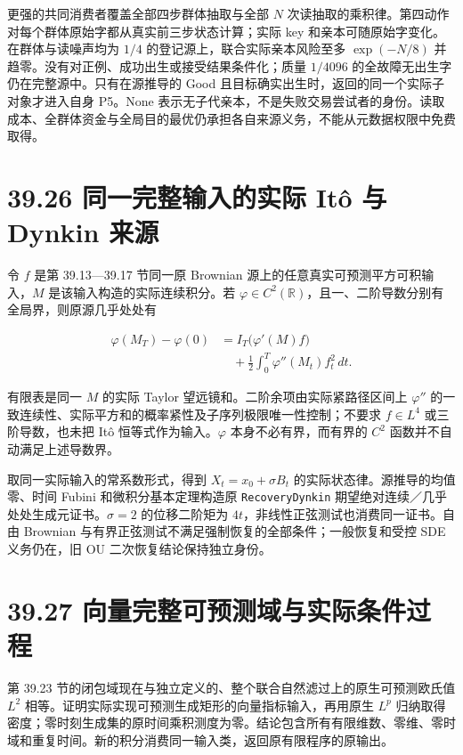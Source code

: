 \documentclass[
  11pt,
  oneside]{book}
\begin{document}
更强的共同消费者覆盖全部四步群体抽取与全部 \(N\) 次读抽取的乘积律。第四动作对每个群体原始字都从真实前三步状态计算；实际 key 和亲本可随原始字变化。在群体与读噪声均为 \(1/4\) 的登记源上，联合实际亲本风险至多 \(\exp(-N/8)\) 并趋零。没有对正例、成功出生或接受结果条件化；质量 \(1/4096\) 的全故障无出生字仍在完整源中。只有在源推导的 Good 且目标确实出生时，返回的同一个实际子对象才进入自身 P5。None 表示无子代亲本，不是失败交易尝试者的身份。读取成本、全群体资金与全局目的最优仍承担各自来源义务，不能从元数据权限中免费取得。

\section{39.26 同一完整输入的实际 Itô 与 Dynkin 来源}\label{ux540cux4e00ux5b8cux6574ux8f93ux5165ux7684ux5b9eux9645-ituxf4-ux4e0e-dynkin-ux6765ux6e90}

令 \(f\) 是第 39.13---39.17 节同一原 Brownian 源上的任意真实可预测平方可积输入，\(M\) 是该输入构造的实际连续积分。若 \(\varphi\in C^2(\mathbb R)\)，且一、二阶导数分别有全局界，则原源几乎处处有

\[\begin{aligned}
\varphi(M_T)-\varphi(0)
&=I_T\bigl(\varphi'(M)f\bigr)\\
&\quad+\frac12\int_0^T\varphi''(M_t)f_t^2\,dt.
\end{aligned}\]

有限表是同一 \(M\) 的实际 Taylor 望远镜和。二阶余项由实际紧路径区间上 \(\varphi''\) 的一致连续性、实际平方和的概率紧性及子序列极限唯一性控制；不要求 \(f\in L^4\) 或三阶导数，也未把 Itô 恒等式作为输入。\(\varphi\) 本身不必有界，而有界的 \(C^2\) 函数并不自动满足上述导数界。

取同一实际输入的常系数形式，得到 \(X_t=x_0+\sigma B_t\) 的实际状态律。源推导的均值零、时间 Fubini 和微积分基本定理构造原 \nolinkurl{RecoveryDynkin} 期望绝对连续／几乎处处生成元证书。\(\sigma=2\) 的位移二阶矩为 \(4t\)，非线性正弦测试也消费同一证书。自由 Brownian 与有界正弦测试不满足强制恢复的全部条件；一般恢复和受控 SDE 义务仍在，旧 OU 二次恢复结论保持独立身份。

\section{39.27 向量完整可预测域与实际条件过程}\label{ux5411ux91cfux5b8cux6574ux53efux9884ux6d4bux57dfux4e0eux5b9eux9645ux6761ux4ef6ux8fc7ux7a0b}

第 39.23 节的闭包域现在与独立定义的、整个联合自然滤过上的原生可预测欧氏值 \(L^2\) 相等。证明实际实现可预测生成矩形的向量指标输入，再用原生 \(L^p\) 归纳取得密度；零时刻生成集的原时间乘积测度为零。结论包含所有有限维数、零维、零时域和重复时间。新的积分消费同一输入类，返回原有限程序的原输出。
\end{document}
